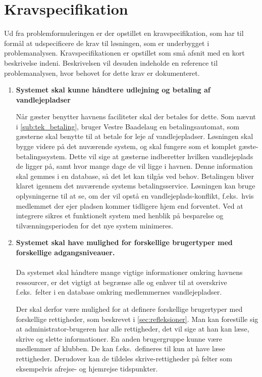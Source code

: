 \section{Kravspecifikation}
\label{sec:Kravspecifikation}

Ud fra problemformuleringen er der opstillet en kravspecifikation, som har til formål at udspecificere de krav til løsningen, som er underbygget i problemanalysen. Kravspecifikationen er opstillet som små afsnit med en kort beskrivelse indeni. Beskrivelsen vil desuden indeholde en reference til problemanalysen, hvor behovet for dette krav er dokumenteret.
 
\begin{enumerate}
  \item \label{itm:udlejning} \textbf{Systemet skal kunne håndtere udlejning og betaling af vandlejepladser}

Når gæster benytter havnens faciliteter skal der betales for dette. Som nævnt i \cref{sub:tek_betaling}, bruger Vestre Baadelaug en betalingsautomat, som gæsterne skal benytte til at betale for leje af vandlejepladser. Løsningen skal bygge videre på det nuværende system, og skal fungere som et komplet gæste-betalingssystem. Dette vil sige at gæsterne indberetter hvilken vandlejeplads de ligger på, samt hvor mange dage de vil ligge i havnen. Denne information skal gemmes i en database, så det let kan tilgås ved behov. Betalingen bliver klaret igennem det nuværende systems betalingsservice. Løsningen kan bruge oplysningerne til at se, om der vil opstå en vandlejeplads-konflikt, f.eks.\ hvis medlemmet der ejer pladsen kommer tidligere hjem end forventet. Ved at integrere sikres et funktionelt system med henblik på besparelse og tilvænningsperioden  for det nye system minimeres.

  \item \label{itm:brugergrupper} \textbf{Systemet skal have mulighed for forskellige brugertyper med forskellige adgangsniveauer.} \\\\
  Da systemet skal håndtere mange vigtige informationer omkring havnens ressourcer, er det vigtigt at begrænse alle og enhver til at overskrive f.eks.\ felter i en database omkring medlemmernes vandlejepladser.

  Der skal derfor være mulighed for at definere forskellige brugertyper med forskellige rettigheder, som beskrevet i \cref{sec:refleksioner}. Man kan forestille sig at administrator-brugeren har alle rettigheder, det vil sige at han kan læse, skrive og slette informationer. En anden brugergruppe kunne være medlemmer af klubben. De kan f.eks.\ defineres til kun at have læse rettigheder. Derudover kan de tildeles skrive-rettigheder på felter som eksempelvis afrejse- og hjemrejse tidspunkter.


\end{enumerate}
